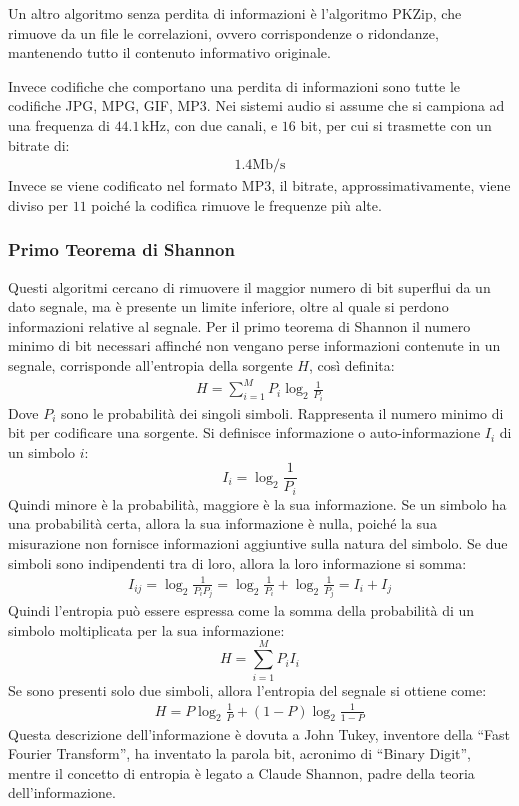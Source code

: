 \documentclass{article}
\numberwithin{equation}{subsection}
\begin{document}
Un altro algoritmo senza perdita di informazioni è l'algoritmo PKZip, che rimuove da un file le correlazioni, ovvero corrispondenze o ridondanze, mantenendo tutto il 
contenuto informativo originale.  

Invece codifiche che comportano una perdita di informazioni sono tutte le codifiche JPG, MPG, GIF, MP3. 
Nei sistemi audio si assume che si campiona ad una frequenza di $44.1\,$kHz, con due canali, e $16$ bit, per cui si trasmette con un bitrate di:
\begin{gather*}
    1.4\mathrm{Mb/s}
\end{gather*}
Invece se viene codificato nel formato MP3, il bitrate, approssimativamente, viene diviso per $11$ poiché la codifica rimuove le frequenze più alte. 

\subsubsection{Primo Teorema di Shannon}

Questi algoritmi cercano di rimuovere il maggior numero di bit superflui da un dato segnale, ma è presente un limite inferiore, oltre al quale si perdono informazioni 
relative al segnale. Per il primo teorema di Shannon il numero minimo di bit necessari affinché non vengano perse informazioni contenute in un segnale, corrisponde 
all'entropia della sorgente $H$, così definita:
\begin{gather}
    H=\displaystyle\sum_{i=1}^MP_i\log_2\frac{1}{P_i}
\end{gather}
Dove $P_i$ sono le probabilità dei singoli simboli. Rappresenta il numero minimo di bit per codificare una sorgente. 
Si definisce informazione o auto-informazione $I_i$ di un simbolo $i$:
\begin{equation}
    I_i=\log_2\displaystyle\frac{1}{P_i}
\end{equation}
Quindi minore è la probabilità, maggiore è la sua informazione. Se un simbolo ha una probabilità certa, allora la sua informazione è nulla, poiché la sua misurazione non 
fornisce informazioni aggiuntive sulla natura del simbolo. Se due simboli sono indipendenti tra di loro, allora la loro informazione si somma:
\begin{gather*}
    I_{ij}=\log_2\displaystyle\frac{1}{P_iP_j}=\log_2\displaystyle\frac{1}{P_i}+\log_2\displaystyle\frac{1}{P_j}=I_i+I_j
\end{gather*}
Quindi l'entropia può essere espressa come la somma della probabilità di un simbolo moltiplicata per la sua informazione:
\begin{equation}
    H=\displaystyle\sum_{i=1}^MP_iI_i
\end{equation}
Se sono presenti solo due simboli, allora l'entropia del segnale si ottiene come:
\begin{gather*}
    H=P\log_2\displaystyle\frac{1}{P}+(1-P)\log_2\frac{1}{1-P}
\end{gather*}
Questa descrizione dell'informazione è dovuta a John Tukey, inventore della ``Fast Fourier Transform'', ha inventato la parola bit, acronimo di ``Binary Digit'', 
mentre il concetto di entropia è legato a Claude Shannon, padre della teoria dell'informazione. 
\end{document}
